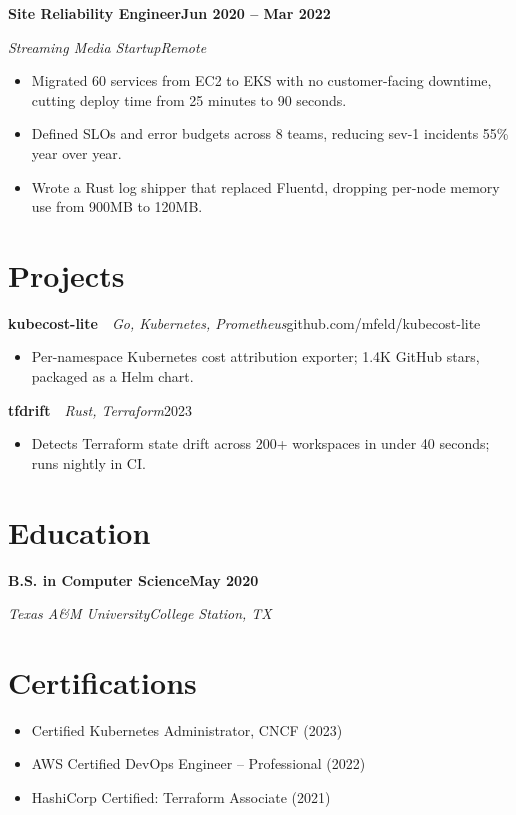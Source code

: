 \documentclass[letterpaper,10pt]{article}
\newcommand{\rRole}[4]{%
  \vspace{3pt}%
  \noindent\textbf{#1}\hfill\textbf{#4}\par
  \noindent\textit{\color{muted}#2}\hfill\textit{\color{muted}#3}\par
  \vspace{1pt}%
}
\newcommand{\rProject}[3]{%
  \vspace{3pt}%
  \noindent\textbf{#1}\ \textbar\ \textit{\color{muted}#2}\hfill#3\par
  \vspace{1pt}%
}
\newcommand{\rEdu}[4]{%
  \vspace{3pt}%
  \noindent\textbf{#1}\hfill\textbf{#4}\par
  \noindent\textit{\color{muted}#2}\hfill\textit{\color{muted}#3}\par
  \vspace{1pt}%
}
\newenvironment{rBullets}
  {\begin{itemize}[leftmargin=13pt,itemsep=1pt,parsep=0pt,topsep=2pt,
                   partopsep=0pt,label=\textbullet]}
  {\end{itemize}}
\begin{document}
\rRole{Site Reliability Engineer}{Streaming Media Startup}{Remote}{Jun 2020 -- Mar 2022}
\begin{rBullets}
  \item Migrated 60 services from EC2 to EKS with no customer-facing downtime, cutting deploy time from 25 minutes to 90 seconds.
  \item Defined SLOs and error budgets across 8 teams, reducing sev-1 incidents 55\% year over year.
  \item Wrote a Rust log shipper that replaced Fluentd, dropping per-node memory use from 900MB to 120MB.
\end{rBullets}

\section{Projects}

\rProject{kubecost-lite}{Go, Kubernetes, Prometheus}{github.com/mfeld/kubecost-lite}
\begin{rBullets}
  \item Per-namespace Kubernetes cost attribution exporter; 1.4K GitHub stars, packaged as a Helm chart.
\end{rBullets}

\rProject{tfdrift}{Rust, Terraform}{2023}
\begin{rBullets}
  \item Detects Terraform state drift across 200+ workspaces in under 40 seconds; runs nightly in CI.
\end{rBullets}

\section{Education}
\rEdu{B.S. in Computer Science}{Texas A\&M University}{College Station, TX}{May 2020}

\section{Certifications}
\begin{rBullets}
  \item Certified Kubernetes Administrator, CNCF (2023)
  \item AWS Certified DevOps Engineer -- Professional (2022)
  \item HashiCorp Certified: Terraform Associate (2021)
\end{rBullets}
\end{document}
